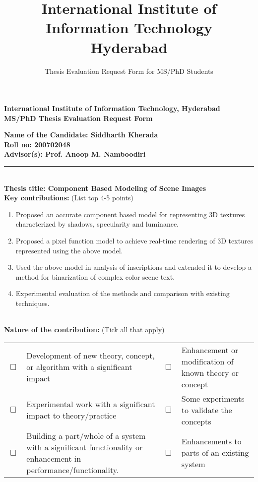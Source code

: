 \documentclass[11pt]{article}
\title{International Institute of Information Technology\\Hyderabad}
\author{Thesis Evaluation Request Form for MS/PhD Students}
\date{}
\begin{document}
\begin{center}
{\Large\bf International Institute of Information Technology, %
\large Hyderabad}\\[2mm]
{\large\bf MS/PhD Thesis Evaluation Request Form}\\[8mm]
\end{center}
\thispagestyle{empty}

{\bf Name of the Candidate: Siddharth Kherada}\\[2mm]
{\bf Roll no: 200702048}%
\\[2mm]
{\bf Advisor(s): Prof. Anoop M. Namboodiri}\\[2mm]

\hrule
\ \\[-4mm]

{\bf Thesis title: Component Based Modeling of Scene Images
}\\

{\bf Key contributions:} (List top 4-5 points)
\begin{enumerate}\itemsep=0mm
\item Proposed an accurate component based model for representing 3D textures characterized by shadows, specularity
and luminance.
\item Proposed a pixel function model to achieve real-time rendering of 3D textures represented using the above model.
\item Used the above model in analysis of inscriptions and extended it to develop a method for binarization of complex 
color scene text.
\item Experimental evaluation of the methods and comparison with existing techniques.
\end{enumerate}

\ \\[-4mm]

{\bf Nature of the contribution:} (Tick all that apply)\vspace{-5mm}
\begin{center}
\begin{tabular}[2]{cp{}|cp{}}
$\Box$ & Development of new theory, concept, or algorithm with a
  significant impact &
$\Box$ & Enhancement or modification of known theory or concept \\[3mm]
$\Box$ & Experimental work with a significant impact to theory/practice &
$\Box$ & Some experiments to validate the concepts\\[3mm]
$\Box$ & Building a part/whole of a system with a significant
  functionality or enhancement in performance/functionality. &
$\Box$ & Enhancements to parts of an existing system \\
\end{tabular}
\end{center}
\end{document}
